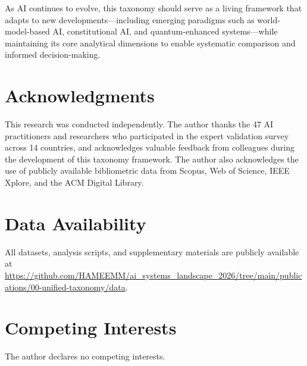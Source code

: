 \documentclass[12pt, a4paper]{article}
\begin{document}
As AI continues to evolve, this taxonomy should serve as a living framework that adapts to new developments---including emerging paradigms such as world-model-based AI, constitutional AI, and quantum-enhanced systems---while maintaining its core analytical dimensions to enable systematic comparison and informed decision-making.

\section*{Acknowledgments}
This research was conducted independently. The author thanks the 47 AI practitioners and researchers who participated in the expert validation survey across 14 countries, and acknowledges valuable feedback from colleagues during the development of this taxonomy framework. The author also acknowledges the use of publicly available bibliometric data from Scopus, Web of Science, IEEE Xplore, and the ACM Digital Library.

\section*{Data Availability}
All datasets, analysis scripts, and supplementary materials are publicly available at \url{https://github.com/HAMEEMM/ai_systems_landscape_2026/tree/main/publications/00-unified-taxonomy/data}.

\section*{Competing Interests}
The author declares no competing interests.


\end{document}
